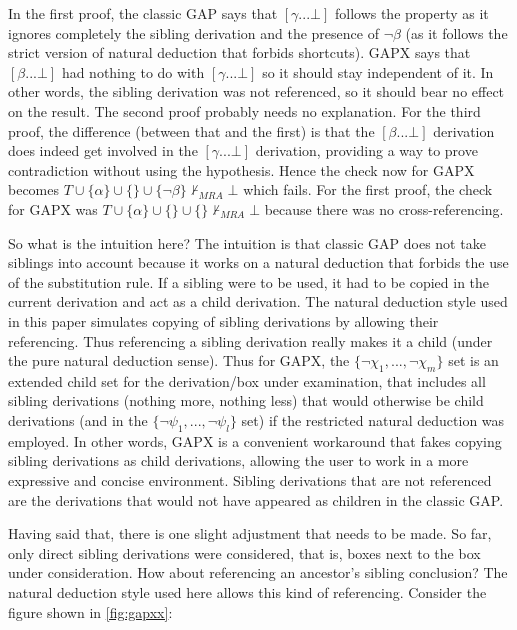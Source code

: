 \documentclass[11pt,twoside,a4paper]{report}
\begin{document}
In the first proof, the classic GAP says that $[\gamma ... \bot]$ follows the property as it ignores completely the sibling derivation and the presence of $\neg\beta$ (as it follows the strict version of natural deduction that forbids shortcuts). GAPX says that $[\beta ... \bot]$ had nothing to do with $[\gamma ... \bot]$ so it should stay independent of it. In other words, the sibling derivation was not referenced, so it should bear no effect on the result. The second proof probably needs no explanation. For the third proof, the difference (between that and the first) is that the $[\beta ... \bot]$ derivation does indeed get involved in the $[\gamma ... \bot]$ derivation, providing a way to prove contradiction without using the hypothesis. Hence the check now for GAPX becomes $T\cup\{\alpha\}\cup\{\}\cup\{\neg\beta\}\nvdash_{MRA}\bot$ which fails. For the first proof, the check for GAPX was $T\cup\{\alpha\}\cup\{\}\cup\{\}\nvdash_{MRA}\bot$ because there was no cross-referencing.

So what is the intuition here? The intuition is that classic GAP does not take siblings into account because it works on a natural deduction that forbids the use of the substitution rule. If a sibling were to be used, it had to be copied in the current derivation and act as a child derivation. The natural deduction style used in this paper simulates copying of sibling derivations by allowing their referencing. Thus referencing a sibling derivation really makes it a child (under the pure natural deduction sense). Thus for GAPX, the $\{\neg\chi_1, ..., \neg\chi_m\}$ set is an extended child set for the derivation/box under examination, that includes all sibling derivations (nothing more, nothing less) that would otherwise be child derivations (and in the $\{\neg\psi_1, ..., \neg\psi_l\}$ set) if the restricted natural deduction was employed. In other words, GAPX is a convenient workaround that fakes copying sibling derivations as child derivations, allowing the user to work in a more expressive and concise environment. Sibling derivations that are not referenced are the derivations that would not have appeared as children in the classic GAP.

Having said that, there is one slight adjustment that needs to be made. So far, only direct sibling derivations were considered, that is, boxes next to the box under consideration. How about referencing an ancestor's sibling conclusion? The natural deduction style used here allows this kind of referencing. Consider the figure shown in \autoref{fig:gapxx}:
\end{document}
